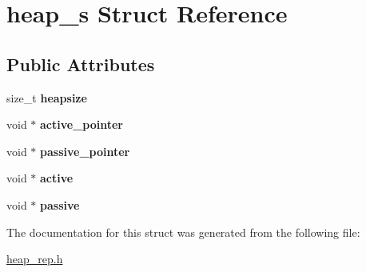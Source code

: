 \hypertarget{structheap__s}{}\section{heap\+\_\+s Struct Reference}
\label{structheap__s}
\subsection*{Public Attributes}
\begin{DoxyCompactItemize}
\item 
\hypertarget{structheap__s_a0993e4815ddb5fdfbb558b9db35297c3}{}size\+\_\+t {\bfseries heapsize}\label{structheap__s_a0993e4815ddb5fdfbb558b9db35297c3}

\item 
\hypertarget{structheap__s_a7122d361855a743da888ea573b94d0e4}{}void $\ast$ {\bfseries active\+\_\+pointer}\label{structheap__s_a7122d361855a743da888ea573b94d0e4}

\item 
\hypertarget{structheap__s_a65c8728852bbc43c57a2bcb8254976ff}{}void $\ast$ {\bfseries passive\+\_\+pointer}\label{structheap__s_a65c8728852bbc43c57a2bcb8254976ff}

\item 
\hypertarget{structheap__s_a35d6166b7f0126daa50ba2c00568dbb7}{}void $\ast$ {\bfseries active}\label{structheap__s_a35d6166b7f0126daa50ba2c00568dbb7}

\item 
\hypertarget{structheap__s_acaa064a547f3bae21c5404c3e5a8e489}{}void $\ast$ {\bfseries passive}\label{structheap__s_acaa064a547f3bae21c5404c3e5a8e489}

\end{DoxyCompactItemize}


The documentation for this struct was generated from the following file\+:\begin{DoxyCompactItemize}
\item 
\hyperlink{heap__rep_8h}{heap\+\_\+rep.\+h}\end{DoxyCompactItemize}
